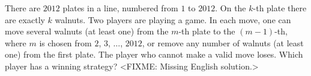 \problem{}
There are $2012$ plates in a line, numbered from $1$ to $2012$.
On the $k$-th plate there are exactly $k$ walnuts.
Two players are playing a game.
In each move, one can move several walnuts (at least one) from the $m$-th plate to the
$(m-1)$-th, where $m$ is chosen from $2$, $3$, $\ldots$, $2012$, or remove any number
of walnuts (at least one) from the first plate.
The player who cannot make a valid move loses.
Which player has a winning strategy?
\solution
<FIXME: Missing English solution.>
\endproblem
